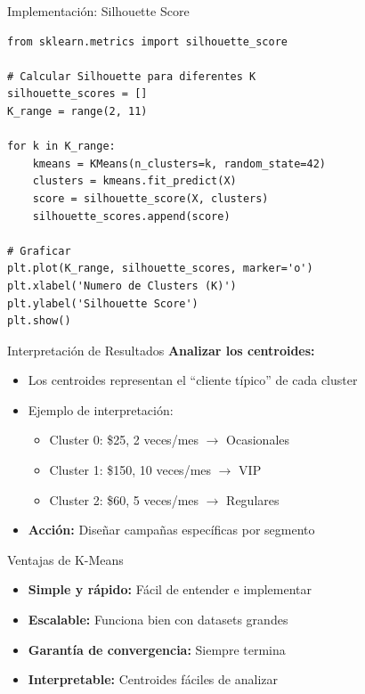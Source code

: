 \documentclass{beamer}
\begin{document}
\begin{frame}[fragile]{Implementación: Silhouette Score}
    \begin{lstlisting}
from sklearn.metrics import silhouette_score

# Calcular Silhouette para diferentes K
silhouette_scores = []
K_range = range(2, 11)

for k in K_range:
    kmeans = KMeans(n_clusters=k, random_state=42)
    clusters = kmeans.fit_predict(X)
    score = silhouette_score(X, clusters)
    silhouette_scores.append(score)

# Graficar
plt.plot(K_range, silhouette_scores, marker='o')
plt.xlabel('Numero de Clusters (K)')
plt.ylabel('Silhouette Score')
plt.show()
    \end{lstlisting}
\end{frame}

\begin{frame}{Interpretación de Resultados}
    \textbf{Analizar los centroides:}
    \begin{itemize}
        \item<1-> Los centroides representan el ``cliente típico'' de cada cluster
        \item<2-> Ejemplo de interpretación:
        \begin{itemize}
            \item Cluster 0: \$25, 2 veces/mes $\rightarrow$ Ocasionales
            \item Cluster 1: \$150, 10 veces/mes $\rightarrow$ VIP
            \item Cluster 2: \$60, 5 veces/mes $\rightarrow$ Regulares
        \end{itemize}
        \item<3-> \textbf{Acción:} Diseñar campañas específicas por segmento
    \end{itemize}
\end{frame}

\begin{frame}{Ventajas de K-Means}
    \begin{itemize}
        \item<1-> \textbf{Simple y rápido:} Fácil de entender e implementar
        \item<2-> \textbf{Escalable:} Funciona bien con datasets grandes
        \item<3-> \textbf{Garantía de convergencia:} Siempre termina
        \item<4-> \textbf{Interpretable:} Centroides fáciles de analizar
    \end{itemize}
\end{frame}
\end{document}
